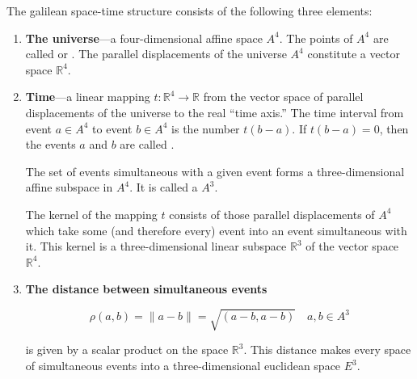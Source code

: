 The galilean space-time structure consists of the following three elements:

\begin{enumerate}
\item \textbf{The universe}---a four-dimensional affine space $A^4$. The points of $A^4$ are called  or . The parallel displacements of the universe $A^4$ constitute a vector space $\mathbb{R}^4$.

\item \textbf{Time}---a linear mapping $t: \mathbb{R}^4 \rightarrow \mathbb{R}$ from the vector space of parallel displacements of the universe to the real ``time axis.'' The time interval from event $a \in A^4$ to event $b \in A^4$ is the number $t(b - a)$. If $t(b - a) = 0$, then the events $a$ and $b$ are called .

The set of events simultaneous with a given event forms a three-dimensional affine subspace in $A^4$. It is called a  $A^3$.

The kernel of the mapping $t$ consists of those parallel displacements of $A^4$ which take some (and therefore every) event into an event simultaneous with it. This kernel is a three-dimensional linear subspace $\mathbb{R}^3$ of the vector space $\mathbb{R}^4$.

\item \textbf{The distance between simultaneous events}

$$\rho(a, b) = \|a - b\| = \sqrt{(a - b, a - b)} \quad a, b \in A^3$$

is given by a scalar product on the space $\mathbb{R}^3$. This distance makes every space of simultaneous events into a three-dimensional euclidean space $E^3$.
\end{enumerate}
